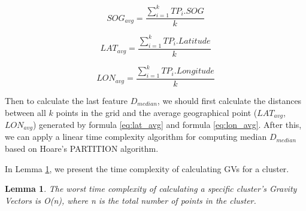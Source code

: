 \documentclass[12pt,glossary]{dalcsthesis}
\newtheorem{lemma}{Lemma}
\begin{document}
\begin{equation}
\label{eq:sog_avg}
SOG_{avg} = \frac{\sum_{i=1}^k TP_i.SOG}{k}
\end{equation}

\begin{equation}
\label{eq:lat_avg}
LAT_{avg} = \frac{\sum_{i=1}^k TP_i.Latitude}{k}
\end{equation}

\begin{equation}
\label{eq:lon_avg}
LON_{avg} = \frac{\sum_{i=1}^k TP_i.Longitude}{k}
\end{equation}


Then to calculate the last feature $D_{median}$, we should first calculate the distances between all $k$ points in the grid and the average geographical point ($LAT_{avg}$, $LON_{avg}$) generated by formula \ref{eq:lat_avg} and formula \ref{eq:lon_avg}. After this, 
we can apply a linear time complexity algorithm for computing median $D_{median}$ based on Hoare's PARTITION algorithm.


In Lemma \ref{lemma:time_gv}, we present the time complexity of calculating GVs for a cluster.

\begin{lemma}
\label{lemma:time_gv}
The 
worst
time complexity of calculating a specific cluster's Gravity Vectors is 
O(n), where n is the total number of points in the cluster.
\end{lemma}
\end{document}
